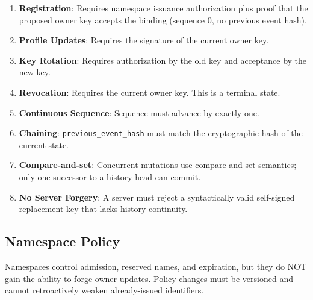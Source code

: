 \documentclass[
]{article}
\providecommand{\tightlist}{%
  \setlength{\itemsep}{0pt}\setlength{\parskip}{0pt}}
\begin{document}
\begin{enumerate}
\def\labelenumi{\arabic{enumi}.}
\tightlist
\item
  \textbf{Registration}: Requires namespace issuance authorization plus
  proof that the proposed owner key accepts the binding (sequence 0, no
  previous event hash).
\item
  \textbf{Profile Updates}: Requires the signature of the current owner
  key.
\item
  \textbf{Key Rotation}: Requires authorization by the old key and
  acceptance by the new key.
\item
  \textbf{Revocation}: Requires the current owner key. This is a
  terminal state.
\item
  \textbf{Continuous Sequence}: Sequence must advance by exactly one.
\item
  \textbf{Chaining}: \texttt{previous\_event\_hash} must match the
  cryptographic hash of the current state.
\item
  \textbf{Compare-and-set}: Concurrent mutations use compare-and-set
  semantics; only one successor to a history head can commit.
\item
  \textbf{No Server Forgery}: A server must reject a syntactically valid
  self-signed replacement key that lacks history continuity.
\end{enumerate}

\hypertarget{namespace-policy}{%
\subsection{Namespace Policy}\label{namespace-policy}}

Namespaces control admission, reserved names, and expiration, but they
do NOT gain the ability to forge owner updates. Policy changes must be
versioned and cannot retroactively weaken already-issued identifiers.
\end{document}
